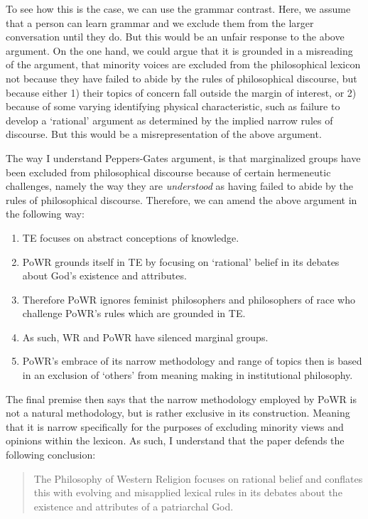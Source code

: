 \documentclass[
  letterpaper,
  DIV=11,
  numbers=noendperiod]{scrreprt}
\providecommand{\tightlist}{%
  \setlength{\itemsep}{0pt}\setlength{\parskip}{0pt}}\usepackage{longtable,booktabs,array}
\begin{document}
\begin{tcolorbox}[enhanced jigsaw, arc=.35mm, breakable, rightrule=.15mm, colback=white, colframe=quarto-callout-important-color-frame, bottomrule=.15mm, leftrule=.75mm, opacityback=0, toprule=.15mm, left=2mm]
\begin{tcolorbox}[enhanced jigsaw, arc=.35mm, breakable, rightrule=.15mm, colback=white, colframe=quarto-callout-tip-color-frame, bottomrule=.15mm, leftrule=.75mm, opacityback=0, toprule=.15mm, left=2mm]
To see how this is the case, we can use the grammar contrast. Here, we
assume that a person can learn grammar and we exclude them from the
larger conversation until they do. But this would be an unfair response
to the above argument. On the one hand, we could argue that it is
grounded in a misreading of the argument, that minority voices are
excluded from the philosophical lexicon not because they have failed to
abide by the rules of philosophical discourse, but because either 1)
their topics of concern fall outside the margin of interest, or 2)
because of some varying identifying physical characteristic, such as
failure to develop a `rational' argument as determined by the implied
narrow rules of discourse. But this would be a misrepresentation of the
above argument.

The way I understand Peppers-Gates argument, is that marginalized groups
have been excluded from philosophical discourse because of certain
hermeneutic challenges, namely the way they are \emph{understood} as
having failed to abide by the rules of philosophical discourse.
Therefore, we can amend the above argument in the following way:

\begin{enumerate}
\def\labelenumi{\arabic{enumi}.}
\tightlist
\item
  TE focuses on abstract conceptions of knowledge.
\item
  PoWR grounds itself in TE by focusing on `rational' belief in its
  debates about God's existence and attributes.
\item
  Therefore PoWR ignores feminist philosophers and philosophers of race
  who challenge PoWR's rules which are grounded in TE.
\item
  As such, WR and PoWR have silenced marginal groups.
\item
  PoWR's embrace of its narrow methodology and range of topics then is
  based in an exclusion of `others' from meaning making in institutional
  philosophy.
\end{enumerate}

The final premise then says that the narrow methodology employed by PoWR
is not a natural methodology, but is rather exclusive in its
construction. Meaning that it is narrow specifically for the purposes of
excluding minority views and opinions within the lexicon. As such, I
understand that the paper defends the following conclusion:

\begin{quote}
The Philosophy of Western Religion focuses on rational belief and
conflates this with evolving and misapplied lexical rules in its debates
about the existence and attributes of a patriarchal God.
\end{quote}


\end{tcolorbox}
\end{tcolorbox}
\end{document}
